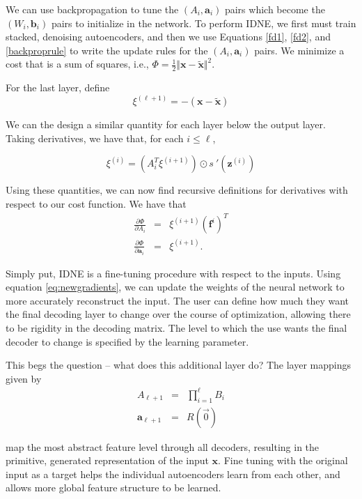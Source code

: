 We can use backpropagation to tune the $(A_i, \mathbf{a}_i)$ pairs which become the $(W_i, \mathbf{b}_i)$ pairs to initialize in the network. To perform IDNE, we first must train stacked, denoising autoencoders, and then we use Equations \eqref{fd1}, \eqref{fd2}, and \eqref{backproprule} to write the update rules for the $(A_i, \mathbf{a}_i)$ pairs. We minimize a cost that is a sum of squares, i.e., $\Phi = \frac{1}{2}\Vert \mathbf{x} - \tilde{\mathbf{x}} \Vert ^2 $.

For the last layer, define
\begin{equation}
\label{eq:finallayer}
\xi^{(\ell+1)} = -(\mathbf{x} - \tilde{\mathbf{x}})
\end{equation}

We can the design a similar quantity for each layer below the output layer. Taking derivatives, we have that, for each $i\leq \ell$,

\begin{equation}
\label{update1}
\xi^{(i)} = (A_i^T\xi^{(i+1)})\odot s\:'(\mathbf{z}^{(i)})
\end{equation}

Using these quantities, we can now find recursive definitions for derivatives with respect to our cost function. We have that 
\begin{eqnarray}
\label{eq:newgradients}
\frac{\partial\Phi}{\partial A_i} &=& \xi^{(i+1)}(\mathbf{f}^{i})^T\\
\frac{\partial\Phi}{\partial \mathbf{a}_i} &=& \xi^{(i+1)}.
\end{eqnarray}


Simply put, IDNE is a fine-tuning procedure with respect to the inputs. Using equation \eqref{eq:newgradients}, we can update the weights of the neural network to more accurately reconstruct the input. The user can define how much they want the final decoding layer to change over the course of optimization, allowing there to be rigidity in the decoding matrix. The level to which the use wants the final decoder to change is specified by the learning parameter.

This begs the question -- what does this additional layer do? The layer mappings given by 
\begin{eqnarray}
A_{\ell+1} &=& \prod_{i=1}^{\ell} B_i \\ 
\mathbf{a}_{\ell+1} &=& R(\overrightarrow{0})
\end{eqnarray}

map the most abstract feature level through all decoders, resulting in the primitive, generated representation of the input $\mathbf{x}$. Fine tuning with the original input as a target helps the individual autoencoders learn from each other, and allows more global feature structure to be learned.


